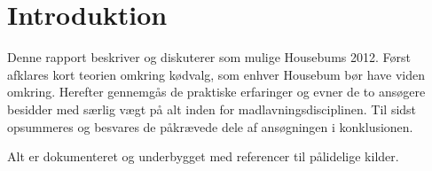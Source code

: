 \section{Introduktion}
Denne rapport beskriver og diskuterer \HM som mulige Housebums 2012. Først afklares kort teorien omkring kødvalg, som enhver Housebum bør have viden omkring. Herefter gennemgås de praktiske erfaringer og evner de to ansøgere besidder med særlig vægt på alt inden for madlavningsdisciplinen. Til sidst opsummeres og besvares de påkrævede dele af ansøgningen i konklusionen. 

Alt er dokumenteret og underbygget med referencer til pålidelige kilder.